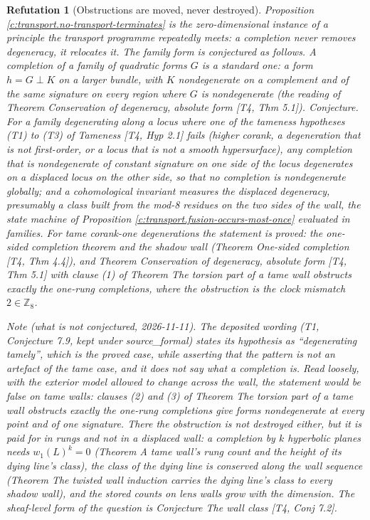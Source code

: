 \documentclass[11pt]{article}
\newtheorem{refutation}[theorem]{Refutation}
\theoremstyle{definition}
\theoremstyle{plain}
\newcommand{\changedmark}[2]{\marginpar{\raggedright\scriptsize\color{#1}#2}}
\providecommand{\shL}{}\renewcommand{\shL}{L}
\begin{document}
\begin{refutation}[Obstructions are moved, never destroyed]\label{c:transport.obstructions-are-moved-never-destroyed}
\changedmark{BurntOrange}{changed since the deposit}
Proposition \ref{c:transport.no-transport-terminates} is the zero-dimensional instance of a principle the transport programme repeatedly meets: a completion never removes degeneracy, it relocates it. The family form is conjectured as follows. A \emph{completion} of a family of quadratic forms $G$ is a standard one: a form $h = G \perp K$ on a larger bundle, with $K$ nondegenerate on a complement and of the same signature on every region where $G$ is nondegenerate (the reading of Theorem \emph{Conservation of degeneracy, absolute form} [T4, Thm 5.1]). \emph{Conjecture.} For a family degenerating along a locus where one of the tameness hypotheses (T1) to (T3) of \emph{Tameness} [T4, Hyp 2.1] fails (higher corank, a degeneration that is not first-order, or a locus that is not a smooth hypersurface), any completion that is nondegenerate of constant signature on one side of the locus degenerates on a displaced locus on the other side, so that no completion is nondegenerate globally; and a cohomological invariant measures the displaced degeneracy, presumably a class built from the mod-8 residues on the two sides of the wall, the state machine of Proposition \ref{c:transport.fusion-occurs-most-once} evaluated in families. For tame corank-one degenerations the statement is proved: the one-sided completion theorem and the shadow wall (Theorem \emph{One-sided completion} [T4, Thm 4.4]), and Theorem \emph{Conservation of degeneracy, absolute form} [T4, Thm 5.1] with clause (1) of Theorem \emph{The torsion part of a tame wall obstructs exactly the one-rung completions}, where the obstruction is the clock mismatch $2 \in \mathbb{Z}_{8}$.

\emph{Note (what is not conjectured, 2026-11-11).} The deposited wording (T1, Conjecture 7.9, kept under source\_formal) states its hypothesis as ``degenerating tamely'', which is the proved case, while asserting that the pattern is not an artefact of the tame case, and it does not say what a completion is. Read loosely, with the exterior model allowed to change across the wall, the statement would be false on tame walls: clauses (2) and (3) of Theorem \emph{The torsion part of a tame wall obstructs exactly the one-rung completions} give forms nondegenerate at every point and of one signature. There the obstruction is not destroyed either, but it is paid for in rungs and not in a displaced wall: a completion by $k$ hyperbolic planes needs $w_{1}(\shL)^{k} = 0$ (Theorem \emph{A tame wall's rung count and the height of its dying line's class}), the class of the dying line is conserved along the wall sequence (Theorem \emph{The twisted wall induction carries the dying line's class to every shadow wall}), and the stored counts on lens walls grow with the dimension. The sheaf-level form of the question is Conjecture \emph{The wall class} [T4, Conj 7.2].


\end{refutation}
\end{document}
